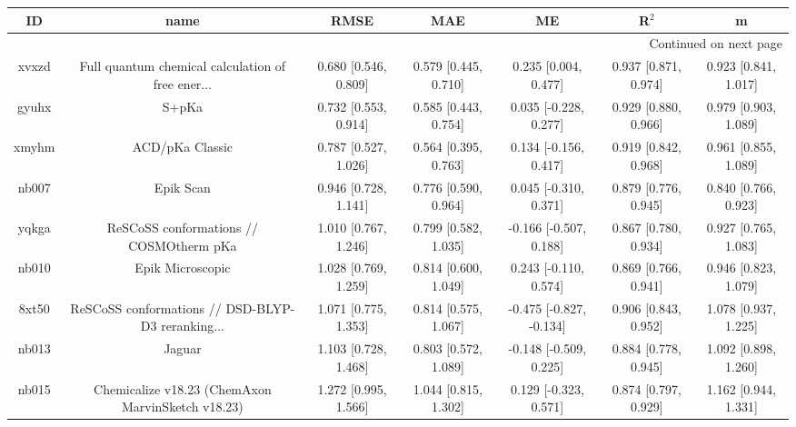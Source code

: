 \documentclass{article}
\begin{document}
\begin{center}
\begin{longtable}{|ccccccc|}
\toprule
    ID &                                               name &                  RMSE &                   MAE &                       ME &                 R$^2$ &                      m \\
\midrule
\endhead
\midrule
\multicolumn{7}{r}{{Continued on next page}} \\
\midrule
\endfoot

\bottomrule
\endlastfoot
 xvxzd &  Full quantum chemical calculation of free ener... &  0.680 [0.546, 0.809] &  0.579 [0.445, 0.710] &     0.235 [0.004, 0.477] &  0.937 [0.871, 0.974] &   0.923 [0.841, 1.017] \\
 gyuhx &                                              S+pKa &  0.732 [0.553, 0.914] &  0.585 [0.443, 0.754] &    0.035 [-0.228, 0.277] &  0.929 [0.880, 0.966] &   0.979 [0.903, 1.089] \\
 xmyhm &                                    ACD/pKa Classic &  0.787 [0.527, 1.026] &  0.564 [0.395, 0.763] &    0.134 [-0.156, 0.417] &  0.919 [0.842, 0.968] &   0.961 [0.855, 1.089] \\
 nb007 &                                          Epik Scan &  0.946 [0.728, 1.141] &  0.776 [0.590, 0.964] &    0.045 [-0.310, 0.371] &  0.879 [0.776, 0.945] &   0.840 [0.766, 0.923] \\
 yqkga &            ReSCoSS conformations // COSMOtherm pKa &  1.010 [0.767, 1.246] &  0.799 [0.582, 1.035] &   -0.166 [-0.507, 0.188] &  0.867 [0.780, 0.934] &   0.927 [0.765, 1.083] \\
 nb010 &                                   Epik Microscopic &  1.028 [0.769, 1.259] &  0.814 [0.600, 1.049] &    0.243 [-0.110, 0.574] &  0.869 [0.766, 0.941] &   0.946 [0.823, 1.079] \\
 8xt50 &  ReSCoSS conformations // DSD-BLYP-D3 reranking... &  1.071 [0.775, 1.353] &  0.814 [0.575, 1.067] &  -0.475 [-0.827, -0.134] &  0.906 [0.843, 0.952] &   1.078 [0.937, 1.225] \\
 nb013 &                                             Jaguar &  1.103 [0.728, 1.468] &  0.803 [0.572, 1.089] &   -0.148 [-0.509, 0.225] &  0.884 [0.778, 0.945] &   1.092 [0.898, 1.260] \\
 nb015 &  Chemicalize v18.23 (ChemAxon MarvinSketch v18.23) &  1.272 [0.995, 1.566] &  1.044 [0.815, 1.302] &    0.129 [-0.323, 0.571] &  0.874 [0.797, 0.929] &   1.162 [0.944, 1.331] \\

\end{longtable}
\end{center}
\end{document}
